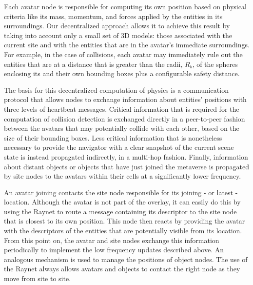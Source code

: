 Each avatar node is responsible for computing its own position based
on physical criteria like its mass, momentum, and forces applied
by the entities in its surroundings. Our decentralized approach allows
it to achieve this result by taking into account only a small set of
3D models: those associated with the current site and with the
entities that are in the avatar's immediate surroundings. 
For example, in the case of collisions, each avatar may immediately
rule out the entities that are at a distance that is greater than the
radii, $R_b$, of the spheres enclosing its and their own bounding boxes
plus a configurable safety distance.



The basis for this decentralized computation of physics is a
communication protocol that allows nodes to exchange information about
entities' positions with three levels of heartbeat messages. Critical
information that is required for the computation of collision
detection is exchanged directly in a peer-to-peer fashion between the
avatars that may potentially collide with each other, based on the
size of their bounding boxes. Less critical information that is
nonetheless necessary to provide the navigator with a clear snapshot
of the current scene state is instead propagated indirectly, in a
multi-hop fashion. Finally, information about distant objects or
objects that have just joined the metaverse is propagated by site
nodes to the avatars within their cells at a significantly lower
frequency.

An avatar joining \sol contacts the site node responsible for its
joining - or latest - location. Although the avatar is not part of the
overlay, it can easily do this by using the Raynet to route a message
containing its descriptor to the site node that is closest to its own
position. This node then reacts by providing the avatar with the
descriptors of the entities that are potentially visible from its
location. From this point on, the avatar and site nodes exchange this
information periodically to implement the low frequency updates
described above.  An analogous mechanism is used to manage the
positions of object nodes. The use of the Raynet always allows avatars
and objects to contact the right node as they move from site to site.

